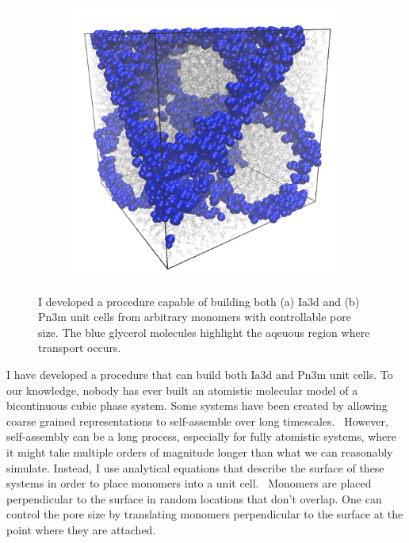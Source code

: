 \documentclass{article}
\begin{document}
\begin{figure}
\begin{subfigure}{0.49\linewidth}
  \includegraphics[width=\linewidth]{schwarz.png}
  \caption{}\label{fig:pn3m}
  \end{subfigure}
  \caption{I developed a procedure capable of building both (a) Ia3d and (b) Pn3m
  unit cells from arbitrary monomers with controllable pore size. The blue
  glycerol molecules highlight the aqeuous region where transport occurs.}\label{fig:q1_unitcells}
  \vspace{-0.5cm}
  \end{figure}
  
  I have developed a procedure that can build both Ia3d and Pn3m unit cells.
  To our knowledge, nobody has ever built an atomistic molecular model of 
  a bicontinuous cubic phase system. Some systems have been created by 
  allowing coarse grained representations to self-assemble over long 
  timescales.~\cite{mondal_self-assembly_2013} However, self-assembly
  can be a long process, especially for fully atomistic systems, where it
  might take multiple orders of magnitude longer than what we can 
  reasonably simulate. Instead, I use analytical equations that describe
  the surface of these systems in order to place monomers into a unit cell.~\cite{benedicto_bicontinuous_1997}
  Monomers are placed perpendicular to the surface in random locations 
  that don't overlap. One can control the pore size by translating monomers
  perpendicular to the surface at the point where they are attached.
  
\end{document}
